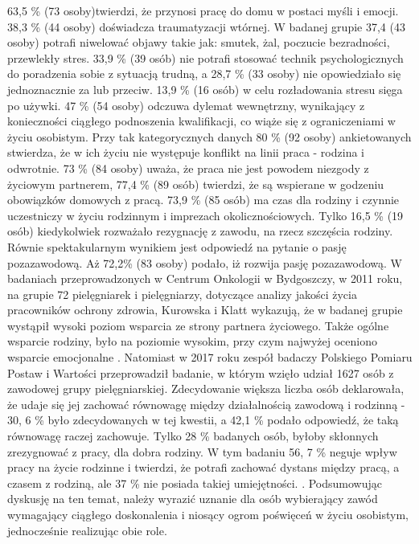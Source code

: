 \documentclass[a4paper,12pt,twoside,openany]{report}
\begin{document}
  63,5 \%  (73 osoby)twierdzi, że przynosi pracę do domu w postaci myśli i emocji. 38,3 \% (44 osoby) doświadcza traumatyzacji wtórnej. W badanej grupie 37,4 (43 osoby) potrafi niwelować objawy takie jak: smutek, żal, poczucie bezradności, przewlekły stres. 33,9 \%  (39 osób) nie potrafi stosować technik psychologicznych do poradzenia sobie z sytuacją trudną, a 28,7 \%  (33 osoby) nie opowiedziało się jednoznacznie za lub przeciw. 13,9 \% (16 osób) w celu rozładowania stresu sięga po używki. 47 \% (54 osoby) odczuwa dylemat wewnętrzny, wynikający z konieczności ciągłego podnoszenia kwalifikacji, co wiąże się z ograniczeniami w życiu osobistym. Przy tak kategorycznych danych 80 \% (92 osoby) ankietowanych stwierdza, że w ich życiu nie występuje konflikt na linii praca - rodzina i odwrotnie. 73 \% (84 osoby) uważa, że praca nie jest powodem niezgody z życiowym partnerem, 77,4 \%  (89 osób) twierdzi, że są wspierane w godzeniu obowiązków domowych z pracą. 73,9 \% (85 osób) ma czas dla rodziny i czynnie uczestniczy w życiu rodzinnym i imprezach okolicznościowych. Tylko 16,5 \% (19 osób) kiedykolwiek rozważało rezygnację z zawodu, na rzecz szczęścia rodziny. Równie spektakularnym wynikiem jest odpowiedź na pytanie o pasję pozazawodową. Aż 72,2\% (83 osoby) podało, iż rozwija pasję pozazawodową.  W badaniach  przeprowadzonych w Centrum Onkologii w Bydgoszczy, w 2011 roku, na grupie 72 pielęgniarek i pielęgniarzy, dotyczące analizy jakości życia pracowników ochrony zdrowia, Kurowska i Klatt  wykazują, że w badanej grupie wystąpił wysoki poziom wsparcia ze strony partnera życiowego. Także ogólne wsparcie rodziny, było na poziomie wysokim, przy czym najwyżej oceniono wsparcie emocjonalne \cite{ poziom}. Natomiast w 2017 roku zespół badaczy Polskiego Pomiaru Postaw i Wartości przeprowadził badanie, w którym wzięło udział 1627 osób z zawodowej grupy pielęgniarskiej. Zdecydowanie większa liczba osób deklarowała, że udaje się jej zachować równowagę między działalnością zawodową i rodzinną - 30, 6 \% było zdecydowanych w tej kwestii, a 42,1 \% podało odpowiedź, że taką równowagę raczej zachowuje. Tylko 28 \% badanych osób, byłoby skłonnych zrezygnować z pracy, dla dobra rodziny. W tym badaniu  56, 7 \% neguje wpływ pracy na życie rodzinne i twierdzi, że potrafi zachować dystans między pracą, a czasem z rodziną, ale 37 \% nie posiada takiej umiejętności. \cite{komunikat}.
Podsumowując dyskusję na ten temat, należy wyrazić uznanie dla osób wybierający zawód wymagający ciągłego doskonalenia i niosący ogrom poświęceń w życiu osobistym, jednocześnie realizując obie role.
\end{document}
